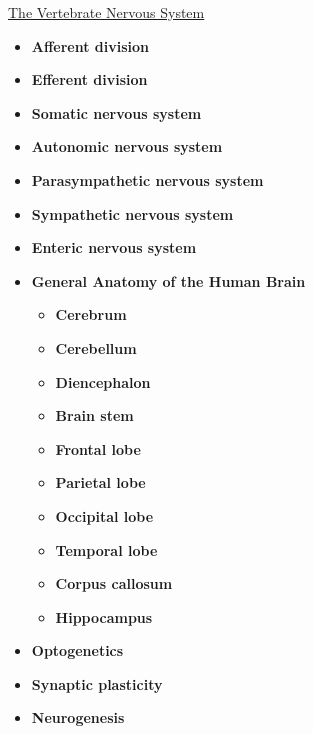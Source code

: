 \documentclass[12pt,letterpaper]{article}
\begin{document}
\hypertarget{43.4}{}
\begin{secbox}{\hyperlink{43}{The Vertebrate Nervous System}}{
    \begin{itemize}
        \item \textbf{Afferent division }
        \item \textbf{Efferent division}
        \item \textbf{Somatic nervous system}
        \item \textbf{Autonomic nervous system}
        \item \textbf{Parasympathetic nervous system}
        \item \textbf{Sympathetic nervous system}
        \item \textbf{Enteric nervous system}
        \item \textbf{General Anatomy of the Human Brain }
            \begin{itemize}
                \item \textbf{Cerebrum}
                \item \textbf{Cerebellum}
                \item \textbf{Diencephalon}
                \item \textbf{Brain stem}
                \item \textbf{Frontal lobe}
                \item \textbf{Parietal lobe}
                \item \textbf{Occipital lobe}
                \item \textbf{Temporal lobe}
                \item \textbf{Corpus callosum}
                \item \textbf{Hippocampus}
            \end{itemize}
        \item \textbf{Optogenetics}
        \item \textbf{Synaptic plasticity}
        \item \textbf{Neurogenesis}
    \end{itemize}
}\end{secbox}
\end{document}

